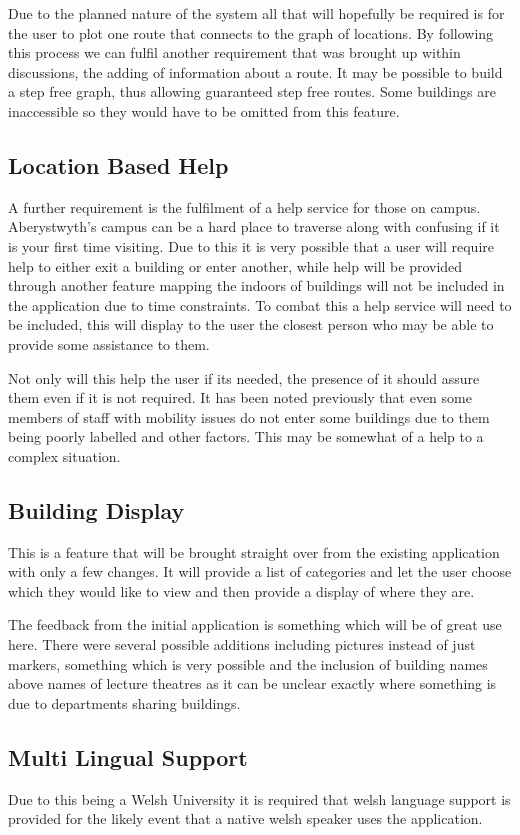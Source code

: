 \documentclass[10pt,a4paper]{article}
\begin{document}
Due to the planned nature of the system all that will hopefully be required is for the user to plot one route that connects to the graph of locations. By following this process we can fulfil another requirement that was brought up within discussions, the adding of information about a route. It may be possible to build a step free graph, thus allowing guaranteed step free routes. Some buildings are inaccessible so they would have to be omitted from this feature. 
\subsection{Location Based Help}
A further requirement is the fulfilment of a help service for those on campus. Aberystwyth's campus can be a hard place to traverse along with confusing if it is your first time visiting. Due to this it is very possible that a user will require help to either exit a building or enter another, while help will be provided through another feature mapping the indoors of buildings will not be included in the application due to time constraints. To combat this a help service will need to be included, this will display to the user the closest person who may be able to provide some assistance to them.

Not only will this help the user if its needed, the presence of it should assure them even if it is not required. It has been noted previously that even some members of staff with mobility issues do not enter some buildings due to them being poorly labelled and other factors. This may be somewhat of a help to a complex situation.
\subsection{Building Display}
This is a feature that will be brought straight over from the existing application with only a few changes. It will provide a list of categories and let the user choose which they would like to view and then provide a display of where they are. 

The feedback from the initial application is something which will be of great use here. There were several possible additions including pictures instead of just markers, something which is very possible and the inclusion of building names above names of lecture theatres as it can be unclear exactly where something is due to departments sharing buildings. 
\subsection{Multi Lingual Support}
Due to this being a Welsh University it is required that welsh language support is provided for the likely event that a native welsh speaker uses the application.
\end{document}
